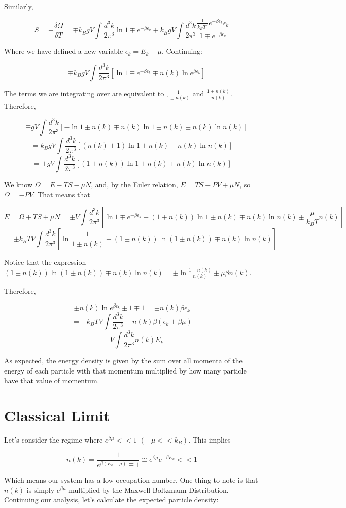 \documentclass{article}
\newcommand{\pardif}[2]{\frac{\delta#1}{\delta#2}}
\newcommand{\bltz}{k_{B}}
\newcommand{\dtk}{\frac{d^{3}k}{2\pi^{3}}}
\newcommand{\ebk}{e^{-\beta\epsilon_{k}}}
\begin{document}
Similarly,

$$S=-\pardif{\Omega}{T}=\mp\bltz gV\int\dtk\ln{1\mp\ebk}+\bltz gV\int\dtk\frac{\frac{1}{\bltz T^{2}}\ebk\epsilon_{k}}{1\mp\ebk}$$

Where we have defined a new variable $\epsilon_{k}=E_{k}-\mu$.  Continuing:

$$=\mp\bltz gV\int\dtk[\ln{1\mp\ebk}\mp n(k)\ln{e^{\beta\epsilon_{k}}}]$$

The terms we are integrating over are equivalent to $\frac{1}{1\pm n(k)}$ and $\frac{1\pm n(k)}{n(k)}$.  Therefore,

$$=\mp gV\int\dtk[-\ln{1\pm n(k)}\mp n(k)\ln{1\pm n(k)}\pm n(k)\ln{n(k)}]$$
$$=\bltz gV\int\dtk[(n(k)\pm 1)\ln{1\pm n(k)}-n(k)\ln{n(k)}]$$
$$=\pm gV\int\dtk[(1\pm n(k))\ln{1\pm n(k)}\mp n(k)\ln{n(k)}]$$

We know $\Omega=E-TS-\mu N$, and, by the Euler relation, $E=TS-PV+\mu N$, so $\Omega=-PV$.  That means that 

$$E=\Omega+TS+\mu N=\pm V\int\dtk[\ln{1\mp\ebk}+(1+n(k))\ln{1\pm n(k)}\mp n(k)\ln{n(k)}\pm\frac{\mu}{\bltz T}n(k)]$$
$$=\pm\bltz TV\int\dtk[\ln{\frac{1}{1\pm n(k)}}+(1\pm n(k))\ln(1\pm n(k))\mp n(k)\ln{n(k)}]$$

Notice that the expression $(1\pm n(k))\ln(1\pm n(k))\mp n(k)\ln{n(k)}=\pm\ln{\frac{1\pm n(k)}{n(k)}}\pm\mu\beta n(k)$.

Therefore,

$$\pm n(k)\ln{e^{\beta\epsilon_{k}}\pm1\mp1}=\pm n(k)\beta\epsilon_{k}$$
$$=\pm\bltz TV\int\dtk\pm n(k)\beta(\epsilon_{k}+\beta\mu)$$
$$=V\int\dtk n(k)E_{k}$$

As expected, the energy density is given by the sum over all momenta of the energy of each particle with that momentum multiplied by how many particle have that value of momentum.  

\section{Classical Limit}

Let's consider the regime where $e^{\beta\mu}<<1$ $(-\mu<<\bltz)$.  This implies

$$n(k)=\frac{1}{e^{\beta(E_{k}-\mu)}\mp 1}\cong e^{\beta\mu}e^{-\beta E_{k}}<<1$$

Which means our system has a low occupation number.  One thing to note is that $n(k)$ is simply $e^{\beta\mu}$ multiplied by the Maxwell-Boltzmann Distribution.  Continuing our analysis, let's calculate the expected particle density:
\end{document}
